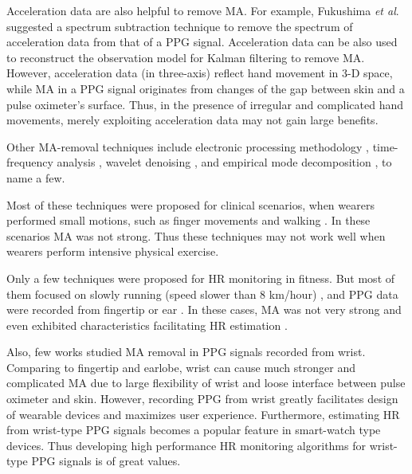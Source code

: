 \documentclass[10pt,twocolumn]{IEEEtran}
\begin{document}
Acceleration data are also  helpful to remove MA. For example, Fukushima \emph{et al}. \cite{fukushima2012SpectrumSubtraction} suggested a spectrum subtraction technique to remove the spectrum of acceleration data from that of a PPG signal. Acceleration data can be also used to reconstruct  the observation model for Kalman filtering \cite{lee2010kalman} to remove MA. However, acceleration data (in three-axis) reflect hand movement in 3-D space, while MA in a PPG signal originates from changes of the gap between skin and a pulse oximeter's surface. Thus, in the presence of irregular and complicated hand movements, merely exploiting acceleration data may not gain large benefits.

Other MA-removal techniques include electronic processing methodology \cite{hayes2001new}, time-frequency analysis \cite{yan2005WVdistribution}, wavelet denoising \cite{raghuram2010wavelet}, and empirical mode decomposition \cite{sun2012robust}, to name a few.

Most of these techniques were proposed for clinical scenarios, when wearers performed small motions, such as finger movements \cite{reddy2009Fourier,ram2012AS_LMS,yousefi2013ANC,krishnan2010TwoStageICA} and walking \cite{yousefi2013ANC}. In these scenarios MA was not strong. Thus these  techniques may not work well when wearers perform intensive physical exercise.


Only a few techniques were proposed for HR monitoring in fitness. But most of them focused on slowly running (speed slower than 8 km/hour) \cite{poh2010motion,yousefi2013ANC}, and PPG data were recorded from fingertip \cite{lopez2012heuristic,yousefi2013ANC} or ear \cite{poh2010motion}. In these cases, MA was not very strong and even exhibited characteristics facilitating HR estimation \cite{lopez2012heuristic}.

Also, few works studied MA removal in PPG signals recorded from wrist. Comparing to fingertip and earlobe, wrist can cause much stronger and complicated MA due to large flexibility of wrist and loose interface between pulse oximeter and skin. However, recording PPG from wrist greatly facilitates design of wearable devices and maximizes user experience. Furthermore, estimating HR from wrist-type PPG signals becomes a popular feature in smart-watch type devices. Thus developing high performance HR monitoring algorithms for wrist-type PPG signals is of great values.
\end{document}
